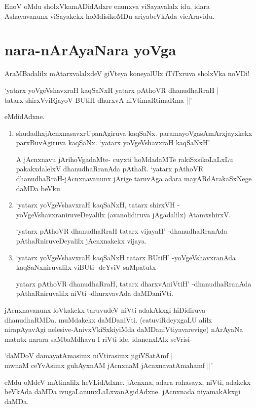 EnoV oMdu sholxVkamADidAdxre enunxva viSayavalalx idu. idara Ashayavanunx viSayakekx hoMdisikoMDu ariyabeVkAda vicAravidu.

\section*{nara-nArAyaNara yoVga}
 
AraMBadalilx mAtarxvalalxdeV giVteya koneyalUlx iTiTxruva sholxVka noVDi!

\begin{shloka}
`yatarx yoVgeVshavxraH kaqSaNxH yatarx pAthoVR dhanudhaRraH |\label{92a}\\
tatarx shirxVviRjayoV BUtiH dhurxvA niVtimaRtimaRma ||' 
\end{shloka}
eMdidAdxne.

\begin{enumerate}
\item shudadhxjAcnxnasavxrUpanAgiruva kaqSaNx. paramayoVgasAmArxjayxkekx parxBuvAgiruva kaqSaNx. `yatarx yoVgeVshavxraH kaqSaNxH'

A jAcnxnavu jArihoVgadaMte- cuyxti hoMdadaMTe rakiSxsikoLaLxLu pakakxdalelxV dhanudhaRranAda pAthaR. `yatarx pAthoVR dhanudhaRraH-jAcnxnavanunx jArige taruvAga adara mayARdArakaSxNege daMDa beVku
\item `yatarx yoVgeVshavxraH kaqSaNxH, tatarx shirxVH -yoVgeVshavxraniruveDeyalilx (avanolidiruva jAgadalilx) AtamxshirxV.

`yatarx pAthoVR dhanudhaRraH tatarx vijayaH' -dhanudhaRranAda pAthaRniruveDeyalilx jAcnxnakekx vijaya.
\item `yatarx yoVgeVshavxraH kaqSaNxH tatarx BUtiH' -yoVgeVshavxranAda kaqSaNxniruvalilx viBUti- deYviV saMpatutx

yatarx pAthoVR dhanudhaRraH, tatarx dharxvAniVtiH' -dhanudhaRranAda pAthaRniruvalilx niVti -dhurxvavAda daMDaniVti.
\end{enumerate}

jAcnxnavanunx loVkakekx taruvudeV niVti adakAkxgi hiDidiruva dhanudhaRMDa. muMdakekx daMDaniVti. (catuviRdeyxgaLU alilx nirapAyavAgi nelesive-AnivxVkiSxkiyiMda daMDaniVtiyavarevige) nArAyaNa matutx narara saMbaMdhavu I riVti ide. idanenxlAlx seVrisi-

\begin{shloka}
`daMDoV damayatAmasimx niVtirasimx jigiVSatAmf |\label{93}\\
mwnaM ceYvA\s simx guhAyxnAM jAcnxnaM jAcnxnavatAmahamf ||'
\end{shloka}
eMdu oMdeV mAtinalilx heVLidAdxne. jAcnxna, adara rahasayx, niVti, adakekx beVkAda daMDa ivugaLanunxLaLxvanAgidAdxne. jAcnxnada niyamakAkxgi daMDa.

